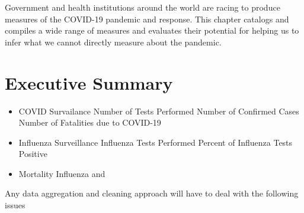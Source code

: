 \documentclass[
]{book}
\begin{document}
Government and health institutions around the world are racing to produce measures of the COVID-19 pandemic and response. This chapter catalogs and compiles a wide range of measures and evaluates their potential for helping us to infer what we cannot directly measure about the pandemic.

\hypertarget{executive-summary}{%
\section{Executive Summary}\label{executive-summary}}

\begin{itemize}
\item
  COVID Survailance
  Number of Tests Performed
  Number of Confirmed Cases
  Number of Fatalities due to COVID-19
\item
  Influenza Surveillance
  Influenza Tests Performed
  Percent of Influenza Tests Positive
\item
  Mortality
  Influenza and
\end{itemize}

Any data aggregation and cleaning approach will have to deal with the following issues
\end{document}
